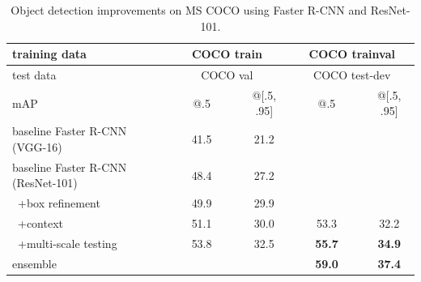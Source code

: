 \documentclass[10pt,twocolumn,letterpaper]{article}
\renewcommand\arraystretch{1.2}
\begin{document}
\renewcommand\arraystretch{1.05}
\setlength{\tabcolsep}{4pt}
\begin{table}[t]
  \begin{center}
    \small
    \begin{tabular}{l|c|c|c|c}
      \hline
      training data                      & \multicolumn{2}{c|}{COCO train} & \multicolumn{2}{c}{COCO trainval}                                 \\
      \hline
      test data                          & \multicolumn{2}{c|}{COCO val}   & \multicolumn{2}{c}{COCO test-dev}                                 \\
      \hline
      mAP                                & ~~~~@.5~~~~                     & @[.5, .95]                        & ~~~~@.5~~~~   & @[.5, .95]    \\
      \hline
      baseline Faster R-CNN (VGG-16)     & 41.5                            & 21.2                              &                               \\
      baseline Faster R-CNN (ResNet-101) & 48.4                            & 27.2                              &                               \\
      ~+box refinement                   & 49.9                            & 29.9                              &                               \\
      ~+context                          & 51.1                            & 30.0                              & 53.3          & 32.2          \\
      ~+multi-scale testing              & 53.8                            & 32.5                              & \textbf{55.7} & \textbf{34.9} \\
      \hline
      ensemble                           &                                 &                                   & \textbf{59.0} & \textbf{37.4} \\
      \hline
    \end{tabular}
  \end{center}
  \vspace{-.5em}
  \caption{Object detection improvements on MS COCO using Faster R-CNN and ResNet-101.}
  \vspace{-.5em}
  \label{tab:detection_coco_improve}
\end{table}
\end{document}
